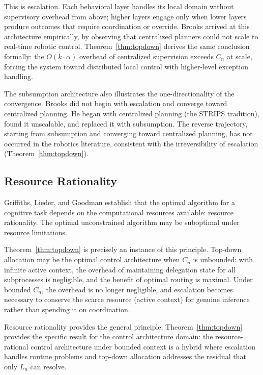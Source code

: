\documentclass[11pt]{article}
\theoremstyle{definition}
\begin{document}
This is escalation. Each behavioral layer handles its local domain
without supervisory overhead from above; higher layers engage only when
lower layers produce outcomes that require coordination or override.
Brooks arrived at this architecture empirically, by observing that
centralized planners could not scale to real-time robotic control.
Theorem~\ref{thm:topdown} derives the same conclusion formally: the
$O(k \cdot \alpha)$ overhead of centralized supervision exceeds $C_n$
at scale, forcing the system toward distributed local control with
higher-level exception handling.

The subsumption architecture also illustrates the one-directionality
of the convergence. Brooks did not begin with escalation and converge
toward centralized planning. He began with centralized planning
(the STRIPS tradition), found it unscalable, and replaced it with
subsumption. The reverse trajectory, starting from subsumption and
converging toward centralized planning, has not occurred in the
robotics literature, consistent with the irreversibility of escalation
(Theorem~\ref{thm:topdown}).

\subsection{Resource Rationality}

Griffiths, Lieder, and Goodman \cite{GriffithsEtAl2015} establish
that the optimal algorithm for a cognitive task depends on the
computational resources available: resource rationality. The
optimal unconstrained algorithm may be suboptimal under resource
limitations.

Theorem~\ref{thm:topdown} is precisely an instance of this principle.
Top-down allocation may be the optimal control architecture when $C_n$
is unbounded: with infinite active context, the overhead of maintaining
delegation state for all subprocesses is negligible, and the benefit
of optimal routing is maximal. Under bounded $C_n$, the overhead is
no longer negligible, and escalation becomes necessary to conserve the
scarce resource (active context) for genuine inference rather than
spending it on coordination.

Resource rationality provides the general principle;
Theorem~\ref{thm:topdown} provides the specific result for the
control architecture domain: the resource-rational control
architecture under bounded context is a hybrid where escalation
handles routine problems and top-down allocation addresses the
residual that only $L_n$ can resolve.
\end{document}
